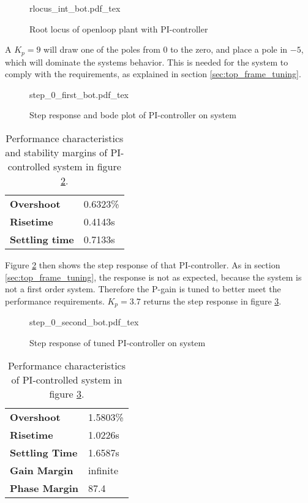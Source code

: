 \documentclass[../../../Main]{subfiles}
\begin{document}
\begin{figure}[H]
\centering
\def\svgwidth{\textwidth}
{rlocus_int_bot.pdf_tex}
\caption{Root locus of openloop plant with PI-controller}
\label{fig:rlocus_int_bot}
\end{figure}

A $K_p = 9$ will draw one of the poles from $0$ to the zero, and place a pole in $-5$, which will dominate the systems behavior. 
This is needed for the system to comply with the requirements, as explained in section \ref{sec:top_frame_tuning}.

\begin{figure}[H]
\centering
\def\svgwidth{\textwidth}
{step_0_first_bot.pdf_tex}
\caption{Step response and bode plot of PI-controller on system}
\label{fig:step_0_first_bot}
\end{figure}


\begin{table}[h]
	 \centering
	 \begin{tabular}{ll}
		 \textbf{Overshoot} & 0.6323\%\\
		 \textbf{Risetime}  & 0.4143s\\
		  \textbf{Settling time}& 0.7133s
	 \end{tabular}
	 \caption{Performance characteristics and stability margins of PI-controlled system in figure \ref{fig:step_0_first_bot}.}
	 \label{tab:performance_0_5}
\end{table}


Figure \ref{fig:step_0_first_bot} then shows the step response of that PI-controller.
As in section \ref{sec:top_frame_tuning}, the response is not as expected, because the system is not a first order system. 
Therefore the P-gain is tuned to better meet the performance requirements. $K_p = 3.7$ returns the step response in figure \ref{fig:step_0_second_bot}.

\begin{figure}[H]
\centering
\def\svgwidth{\textwidth}
{step_0_second_bot.pdf_tex}
\caption{Step response of tuned PI-controller on system}
\label{fig:step_0_second_bot}
\end{figure}


\begin{table}[h]
	 \centering
	 \begin{tabular}{ll}
		 \textbf{Overshoot} & 1.5803\%\\
		 \textbf{Risetime}  & 1.0226s\\
		 \textbf{Settling Time} & 1.6587s\\
	         \textbf{Gain Margin} & infinite\\
		 \textbf{Phase Margin} & 87.4\\
	 \end{tabular}
	 \caption{Performance characteristics of PI-controlled system in figure \ref{fig:step_0_second_bot}.}
	 \label{tab:performance_0_6}
\end{table}
\end{document}
